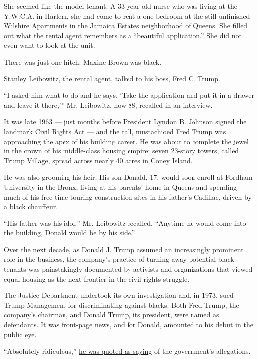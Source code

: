 She seemed like the model tenant. A 33-year-old nurse who was living at
the Y.W.C.A. in Harlem, she had come to rent a one-bedroom at the
still-unfinished Wilshire Apartments in the Jamaica Estates neighborhood
of Queens. She filled out what the rental agent remembers as a
``beautiful application.'' She did not even want to look at the unit.

There was just one hitch: Maxine Brown was black.

Stanley Leibowitz, the rental agent, talked to his boss, Fred C. Trump.

``I asked him what to do and he says, `Take the application and put it
in a drawer and leave it there,''' Mr. Leibowitz, now 88, recalled in an
interview.

It was late 1963 --- just months before President Lyndon B. Johnson
signed the landmark Civil Rights Act --- and the tall, mustachioed Fred
Trump was approaching the apex of his building career. He was about to
complete the jewel in the crown of his middle-class housing empire:
seven 23-story towers, called Trump Village, spread across nearly 40
acres in Coney Island.

He was also grooming his heir. His son Donald, 17, would soon enroll at
Fordham University in the Bronx, living at his parents' home in Queens
and spending much of his free time touring construction sites in his
father's Cadillac, driven by a black chauffeur.

``His father was his idol,'' Mr. Leibowitz recalled. ``Anytime he would
come into the building, Donald would be by his side.''

Over the next decade, as
\href{http://www.nytimes.com/2016/08/31/us/politics/donald-trump-mexico.html}{Donald
J. Trump} assumed an increasingly prominent role in the business, the
company's practice of turning away potential black tenants was
painstakingly documented by activists and organizations that viewed
equal housing as the next frontier in the civil rights struggle.

The Justice Department undertook its own investigation and, in 1973,
sued Trump Management for discriminating against blacks. Both Fred
Trump, the company's chairman, and Donald Trump, its president, were
named as defendants. It
\href{http://www.nytimes.com/times-insider/2015/07/30/1973-meet-donald-trump/?_r=0}{was
front-page news}, and for Donald, amounted to his debut in the public
eye.

``Absolutely ridiculous,''
\href{http://www.nytimes.com/interactive/2016/08/27/us/politics/times-1973.html}{he
was quoted as saying} of the government's allegations.

